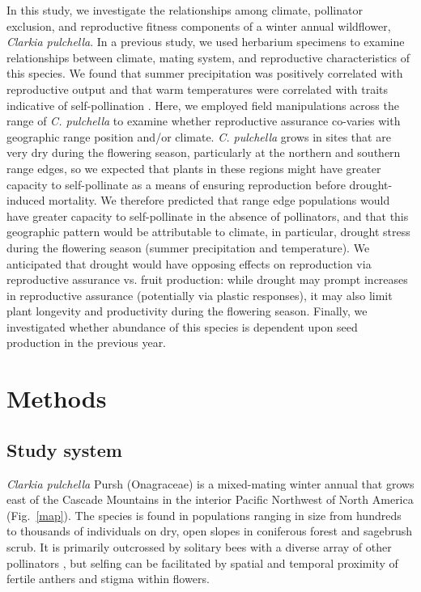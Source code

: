 \documentclass{article}
\begin{document}
In this study, we investigate the relationships among climate, pollinator exclusion, and reproductive fitness components of a winter annual wildflower, \textit{Clarkia pulchella}. In a previous study, we used herbarium specimens to examine relationships between climate, mating system, and reproductive characteristics of this species. We found that summer precipitation was positively correlated with reproductive output and that warm temperatures were correlated with traits indicative of self-pollination \citep{bontrager2016effects}. Here, we employed field manipulations across the range of \textit{C. pulchella} to examine whether reproductive assurance co-varies with geographic range position and/or climate. \textit{C. pulchella} grows in sites that are very dry during the flowering season, particularly at the northern and southern range edges, so we expected that plants in these regions might have greater capacity to self-pollinate as a means of ensuring reproduction before drought-induced mortality. We therefore predicted that range edge populations would have greater capacity to self-pollinate in the absence of pollinators, and that this geographic pattern would be attributable to climate, in particular, drought stress during the flowering season (summer precipitation and temperature). We anticipated that drought would have opposing effects on reproduction via reproductive assurance vs. fruit production: while drought may prompt increases in reproductive assurance (potentially via plastic responses), it may also limit plant longevity and productivity during the flowering season. Finally, we investigated whether abundance of this species is dependent upon seed production in the previous year.

\section*{Methods}

\subsection*{Study system}
\textit{Clarkia pulchella} Pursh (Onagraceae) is a mixed-mating winter annual that grows east of the Cascade Mountains in the interior Pacific Northwest of North America (Fig.\ \ref{map}). The species is found in populations ranging in size from hundreds to thousands of individuals on dry, open slopes in coniferous forest and sagebrush scrub. It is primarily outcrossed by solitary bees \citep{palladini2013indirect} with a diverse array of other pollinators \citep{macswain1973comparative}, but selfing can be facilitated by spatial and temporal proximity of fertile anthers and stigma within flowers.
\end{document}

